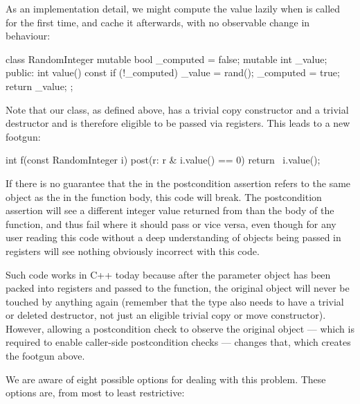 As an implementation detail, we might compute the value lazily when  is called for the first time, and cache it afterwards, with no observable change in behaviour:
 \begin{codeblock}
class RandomInteger {
  mutable bool _computed = false;
  mutable int  _value;
public:
  int value() const {
    if (!_computed) {
      _value = rand();
      _computed = true;
    }
    return _value;
  }
};
 \end{codeblock}
Note that our  class, as defined above, has a trivial copy constructor and a trivial destructor and is therefore eligible to be passed via registers. This leads to a new footgun: 
 \begin{codeblock}
int f(const RandomInteger i)
post(r: r & i.value() == 0) {
  return ~i.value();
}
 \end{codeblock}
If there is no guarantee that the  in the postcondition assertion refers to the same object as the  in the function body, this code will break. The postcondition assertion will see a different integer value returned from  than the body of the function, and thus fail where it should pass or vice versa, even though for any user reading this code without a deep understanding of objects being passed in registers will see nothing obviously incorrect with this code.

Such code works in C++ today because after the parameter object has been packed into registers and passed to the function,  the original object will never be touched by anything again (remember that the type also needs to have a trivial or deleted destructor, not just an eligible trivial copy or move constructor). However, allowing a postcondition check to observe the original object --- which is required to enable caller-side postcondition checks --- changes that, which creates the footgun above.

We are aware of eight possible options for dealing with this problem. These options are, from most to least restrictive:

\renewcommand\labelenumi{R\arabic{enumi}.}
\renewcommand\theenumi\labelenumi

